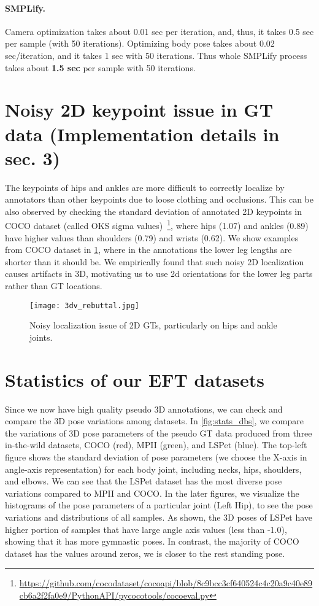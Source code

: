 \documentclass[10pt,twocolumn,letterpaper]{article}
\begin{document}
	\paragraph{SMPLify.}
Camera optimization takes about 0.01 sec per iteration, and, thus, it takes 0.5 sec per sample (with 50 iterations). Optimizing body pose takes about 0.02 sec/iteration, and it takes 1 sec with 50 iterations. Thus whole SMPLify process takes about \textbf{1.5 sec} per sample with 50 iterations.
	
	
	\section{Noisy 2D keypoint issue in GT data (Implementation  details in sec. 3)}
	\label{sec:noisy_gt}
	The keypoints of hips and ankles are more difficult to correctly localize by annotators than other keypoints due to loose clothing and occlusions. This can be also observed by checking the standard deviation of annotated 2D keypoints in COCO dataset (called OKS sigma values)~\footnote{\url{https://github.com/cocodataset/cocoapi/blob/8c9bcc3cf640524c4c20a9c40e89cb6a2f2fa0e9/PythonAPI/pycocotools/cocoeval.py}}, where hips (1.07) and ankles (0.89) have higher values than shoulders (0.79) and wrists (0.62). We show examples from COCO dataset in \cref{fig:noisy_2dkeypoint}, where in the annotations the lower leg lengths are shorter than it should be. We empirically found that such noisy 2D localization causes artifacts in 3D, motivating us to use 2d orientations for the lower leg parts rather than GT locations.
	
	
	\begin{figure}[t]
\texttt{[image: 3dv\_rebuttal.jpg]}
		\caption{Noisy localization issue of 2D GTs, particularly on hips and ankle joints.
			\label{fig:noisy_2dkeypoint}}
\end{figure}
	
	
	
	\section{Statistics of our EFT datasets}
	Since we now have high quality pseudo 3D annotations, we can check and compare the 3D pose variations among datasets. In \cref{fig:stats_dbs}, we compare the variations of 3D pose parameters of the pseudo GT data produced from three in-the-wild datasets, COCO (red), MPII (green), and LSPet (blue). The top-left figure shows the standard deviation of pose parameters (we choose the X-axis in angle-axis representation) for each body joint, including necks, hips, shoulders, and elbows. We can see that the LSPet dataset has the most diverse pose variations compared to MPII and COCO. In the later figures, we visualize the histograms of the pose parameters of a particular joint (Left Hip), to see the pose variations and distributions of all samples. As shown, the 3D poses of LSPet have higher portion of samples that have large angle axis values (less than -1.0), showing that it has more gymnastic poses. In contrast, the majority of COCO dataset has the values around zeros, we is closer to the rest standing pose.
	
\end{document}
